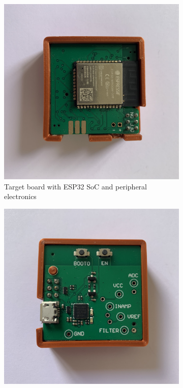 \begin{figure}[!htb]
     \centering
     \begin{subfigure}[b]{0.3\textwidth}
         \centering
         \includegraphics[width=\textwidth]{esp-top}
         \caption{Target board with ESP32 SoC and peripheral electronics}
         \label{fig:esp-hardware-soc}
     \end{subfigure}
     \hfill
     \begin{subfigure}[b]{0.3\textwidth}
         \centering
         \includegraphics[width=\textwidth]{programmer}

\end{subfigure}
\end{figure}
